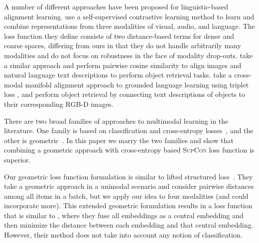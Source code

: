 \documentclass[sigconf,natbib=true,anonymous=true]{acmart}
\newcommand{\supcon}{\textsc{SupCon}}
\begin{document}
A number of different approaches have been proposed for linguistic-based alignment learning. \citet{alayrac2020self} use a self-supervised contrastive learning method to learn and combine representations from three modalities of visual, audio, and language. 
The loss function they define consists of two distance-based terms for dense and coarse spaces, differing from ours in that they do not handle arbitrarily many modalities and do not focus on robustness in the face of modality drop-outs. \citet{Nguyen-RSS-20} take a similar approach and perform pairwise cosine similarity to align images and natural language text descriptions to perform object retrieval tasks. \citet{triplet_loss_2021_CVPR} take a cross-modal manifold alignment approach to grounded language learning using triplet loss \citep{Chechik:2010:LSO:1756006.1756042}, and perform object retrieval by connecting text descriptions of objects to their corresponding RGB-D images.

There are two broad families of approaches to multimodal learning in the literature. One family is based on classification and cross-entropy losses~\cite{NEURIPS2020_supervised_contrastive, chen2020simple}, and the other is geometric~\cite{ICML22GeometricMultimodal,Carvalho-cooking-triplet,salvador2017cooking,triplet_loss_2021_CVPR}. In this paper we marry the two families and show that combining a geometric approach with cross-entropy based \supcon{} loss function is superior.

Our geometric loss function formulation is similar to lifted structured loss~\citep{songCVPR16LiftedStructured}. They take a geometric approach in a unimodal scenario and consider pairwise distances among all items in a batch, but we apply our idea to four modalities (and could incorporate more).
This extended geometric formulation results in a loss function that is similar to \citet{ICML22GeometricMultimodal}, where they 
fuse all embeddings as a central embedding and then minimize the distance between each embedding and that central embedding. However, their method does not take into account any notion of classification.
\end{document}
